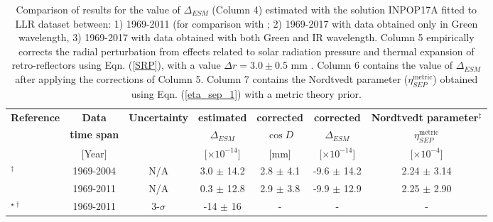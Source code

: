 \documentclass[fleqn,usenatbib,referee]{mnras}
\begin{document}
\begin{table*}
\caption{Comparison of results for the value of $\Delta_{ESM}$ (Column 4) estimated with the solution INPOP17A fitted to LLR dataset between: 1) 1969-2011 (for comparison with \protect\cite{Williams2012,Muller2012}; 2) 1969-2017 with data obtained only in Green wavelength, 3) 1969-2017 with data obtained with both Green and IR wavelength. Column 5 empirically corrects the radial perturbation from effects related to solar radiation pressure and thermal expansion of retro-reflectors using Eqn. (\ref{SRP}), with a value $\Delta{r}= 3.0 \pm 0.5$ mm \protect\cite[]{Williams2012}. Column 6 contains the value of $\Delta_{ESM}$ after applying the corrections of Column 5. Column 7 contains the Nordtvedt parameter ($\eta_{SEP}^\mathrm{metric}$) obtained using Eqn. (\ref{eta_sep_1}) with a metric theory prior.}
\label{mgmi}
\begin{tabular}{lcccccc}
\toprule
\textbf{Reference} 		             &\textbf{Data}	       & \textbf{Uncertainty}		& \textbf{estimated}      		                         &\textbf{corrected} 					& \textbf{corrected}                        & \textbf{Nordtvedt parameter$^\ddag$}                       \\
				                                &\textbf{time span}	 & 		                                     & \textbf{$\Delta_{ESM}$} 	                         & \textbf{$\cos{D}$} 					& \textbf{$\Delta_{ESM}$}           & \textbf{$\eta_{SEP}^\mathrm{metric}$}                     \\ 
				                                &{[}Year{]}		       & 		                                     & [$\times10^{-14}$] 			                         & [mm] 								& [$\times10^{-14}$]                      & [$\times 10^{-4}$]                       \\ \midrule
\cite{Williams2009}$^\dag$ 		&1969-2004 		       & N/A 			                  & 3.0 $\pm$ 14.2 				                         & 2.8 $\pm$ 4.1 						& -9.6 $\pm$ 14.2                            & 2.24 $\pm$ 3.14                         \\
\cite{Williams2012} 		             &1969-2011 		       & N/A		                              & 0.3 $\pm$ 12.8 			 	                         & 2.9 $\pm$ 3.8 						& -9.9 $\pm$ 12.9                            & 2.25 $\pm$ 2.90                        \\
\cite{Muller2012}$^{\star\dag}$	&1969-2011 		       & 3-$\sigma$		                  & -14 $\pm$ 16    			                               & - 						                   & -                                                    & -                         \\ 

\end{tabular}
\end{table*}
\end{document}
